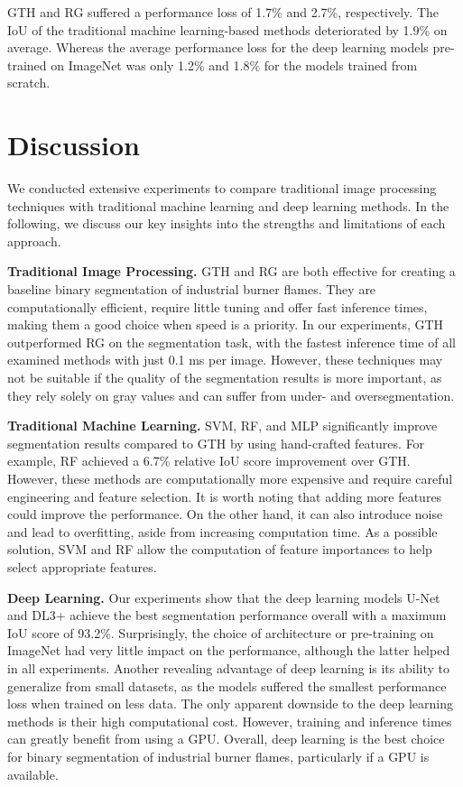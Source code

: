 \documentclass{isprs} %
\begin{document}
GTH and RG suffered a performance loss of 1.7\% and 2.7\%, respectively. The IoU of the traditional machine learning-based methods deteriorated by 1.9\% on average. Whereas the average performance loss for the deep learning models pre-trained on ImageNet was only 1.2\% and 1.8\% for the models trained from scratch. 


\section{Discussion}
We conducted extensive experiments to compare traditional image processing techniques with traditional machine learning and deep learning methods. In the following, we discuss our key insights into the strengths and limitations of each approach. 

\textbf{Traditional Image Processing.} GTH and RG are both effective for creating a baseline binary segmentation of industrial burner flames. They are computationally efficient, require little tuning and offer fast inference times, making them a good choice when speed is a priority. In our experiments, GTH outperformed RG on the segmentation task, with the fastest inference time of all examined methods with just 0.1 ms per image. However, these techniques may not be suitable if the quality of the segmentation results is more important, as they rely solely on gray values and can suffer from under- and oversegmentation.  

\textbf{Traditional Machine Learning.} SVM, RF, and MLP significantly improve segmentation results compared to GTH by using hand-crafted features. For example, RF achieved a 6.7\% relative IoU score improvement over GTH. However, these methods are computationally more expensive and require careful engineering and feature selection. It is worth noting that adding more features could improve the performance. On the other hand, it can also introduce noise and lead to overfitting, aside from increasing computation time. As a possible solution, SVM and RF allow the computation of feature importances to help select appropriate features.

\textbf{Deep Learning.} Our experiments show that the deep learning models U-Net and DL3+ achieve the best segmentation performance overall with a maximum IoU score of 93.2\%. Surprisingly, the choice of architecture or pre-training on ImageNet had very little impact on the performance, although the latter helped in all experiments. Another revealing advantage of deep learning is its ability to generalize from small datasets, as the models suffered the smallest performance loss when trained on less data. The only apparent downside to the deep learning methods is their high computational cost. However, training and inference times can greatly benefit from using a GPU. Overall, deep learning is the best choice for binary segmentation of industrial burner flames, particularly if a GPU is available.   
\end{document}
